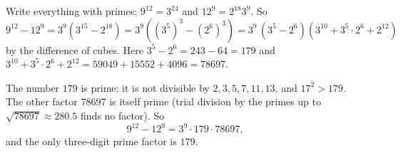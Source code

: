 Write everything with primes: $9^{12}=3^{24}$ and $12^9=2^{18}3^9$. So
\[
9^{12}-12^9=3^9\left(3^{15}-2^{18}\right)=3^9\left((3^5)^3-(2^6)^3\right)=3^9\,(3^5-2^6)\left(3^{10}+3^5\cdot2^6+2^{12}\right)
\]
by the difference of cubes. Here $3^5-2^6=243-64=179$ and $3^{10}+3^5\cdot2^6+2^{12}=59049+15552+4096=78697$.

The number $179$ is prime: it is not divisible by $2,3,5,7,11,13$, and $17^2>179$. The other factor $78697$ is itself prime (trial division by the primes up to $\sqrt{78697}\approx280.5$ finds no factor). So
\[
9^{12}-12^9=3^9\cdot179\cdot78697,
\]
and the only three-digit prime factor is $\boxed{179}$.
